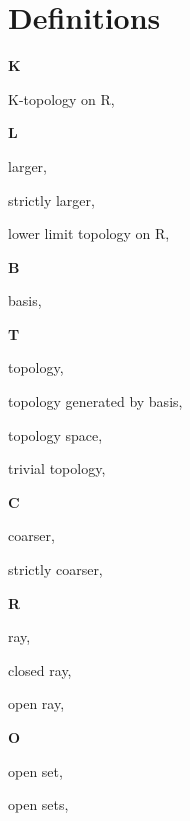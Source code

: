 \section*{Definitions}

\begin{multicols}{2}

\vspace{1em}\large{\textbf{K}}

K-topology on R, \pageref{def:KTopologyOnTheRealLine}

\vspace{1em}\large{\textbf{L}}

larger, \pageref{def:Comparable}

\hspace{2em}strictly larger, \pageref{def:Comparable}

lower limit topology on R, \pageref{def:LowerLimitTopologyOnTheRealLine}

\vspace{1em}\large{\textbf{B}}

basis, \pageref{def:Basis}

\vspace{1em}\large{\textbf{T}}

topology, \pageref{def:Topology}

topology generated by basis, \pageref{def:TopologyGeneratedByBasis}

topology space, \pageref{def:TopologySpace}

trivial topology, \pageref{def:TrivialTopology}

\vspace{1em}\large{\textbf{C}}

coarser, \pageref{def:Comparable}

\hspace{2em}strictly coarser, \pageref{def:Comparable}

\vspace{1em}\large{\textbf{R}}

ray, \pageref{def:Ray}

\hspace{2em}closed ray, \pageref{def:Ray}

\hspace{2em}open ray, \pageref{def:Ray}

\vspace{1em}\large{\textbf{O}}

open set, \pageref{def:OpenSet}

open sets, \pageref{def:OpenSets}


\end{multicols}
